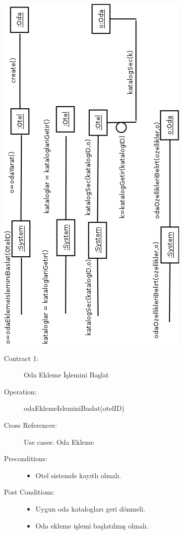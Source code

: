 \documentclass[12pt,a4paper]{report}
\begin{document}
\begin{center}
\includegraphics{dia/eventdiagram-usecase3}
\end{center}

\newpage

\begin{description}
\item[Contract 1:] Oda Ekleme İşlemini Başlat
\item[Operation:] odaEklemeIsleminiBaslat(otelID)
\item[Cross References:] Use cases: Oda Ekleme
\item[Preconditions:] \hspace{10 mm}
\begin{itemize}
\item Otel sistemde kayıtlı olmalı.
\end{itemize}
\item[Post Conditions:] \hspace{10 mm}
\begin{itemize} 
\item Uygun oda katalogları geri dönmeli.
\item Oda ekleme işlemi başlatılmış olmalı. \\
\end{itemize}
\end{description}
\end{document}
